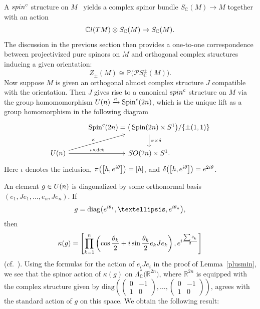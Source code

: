 \documentclass[11pt]{article}
\numberwithin{equation}{section}
\newcommand{\R}{\mathbb{R}}
\newcommand{\C}{\mathbb{C}}
\DeclareMathOperator{\Spin}{Spin}
\newcommand{\CCl}{\mathbb{C}{\rm l}}
\numberwithin{equation}{section}
\begin{document}
A ${\rm spin}^{\rm c}$ structure on $M$~\cite[Appendix~D]{LM} yields a complex spinor
bundle $S_\C(M)\to M$ together with an action
\[
\CCl(TM) \otimes S_\C(M) \to S_\C(M).
\]
The discussion in the previous section then provides a one-to-one correspondence between projectivized pure spinors on $M$ and orthogonal complex structures inducing a given orientation:
\[
Z_{\pm}(M) \cong \mathbb{P}\big( {\mathcal P}S _{\C}^{\pm}(M)\big).
\]
Now suppose $M$ is given an orthogonal almost complex structure $J$ compatible with the orientation. Then $J$ gives rise to a canonical ${\rm spin}^{\rm c}$ structure on $M$ via the group homomomorphism ${\rm U}(n) \xrightarrow{\kappa} \Spin^{\rm c}(2n)$, which is the unique
lift as a group homomorphism in the following diagram{\samepage
\[
\begin{tikzcd}
& \Spin^{\rm c}(2n) = \big(\Spin(2n) \times S^1\big)/\{\pm(1,1)\} \ar[d, "\pi \times \delta"] \\
{\rm U}(n) \ar[ur,"\kappa"] \ar[r,"\iota \times \det"] & {\rm SO}(2n) \times S^1.
\end{tikzcd}
\]
Here $\iota$ denotes the inclusion, $\pi\big(\big[h, {\rm e}^{{\rm i}\theta}\big]\big) = [h]$, and $\delta\big(\big[h,{\rm e}^{{\rm i}\theta}\big]\big)={\rm e}^{2{\rm i}\theta}$.}

An element $g\in {\rm U}(n)$ is diagonalized by some orthonormal basis $(e_1,Je_1, \ldots, e_n, Je_n)$. If
\[g=\mathrm{diag}\big({\rm e}^{{\rm i}\theta_1},\ldots, {\rm e}^{{\rm i}\theta_n}\big),\]
then
\[
\kappa(g)= \left[ \prod_{k=1}^n \left( \cos \frac{\theta_k} 2 + {\rm i} \sin \frac{\theta_k}{2} e_k J e_k\right), {\rm e}^{{\rm i} \frac{\sum \theta_k}{2}} \right]
\]
 (cf.~\cite[equation~(D.10)]{LM}). Using
the formulas for the action of $e_i Je_i$ in the proof of Lemma~\ref{plusmin}, we see that the spinor action of $\kappa(g)$
on $\Lambda^*_{\C}\big(\R^{2n}\big)$, where $\R^{2n}$ is equipped with the complex structure given by $\mathrm{diag}\left( \left(\begin{smallmatrix} 0 & -1 \\ 1 & 0 \end{smallmatrix}\right), \ldots, \left(\begin{smallmatrix} 0 & -1 \\ 1 & 0 \end{smallmatrix}\right) \right)$, agrees with the standard action of $g$ on this space. We obtain the following result:
\end{document}
